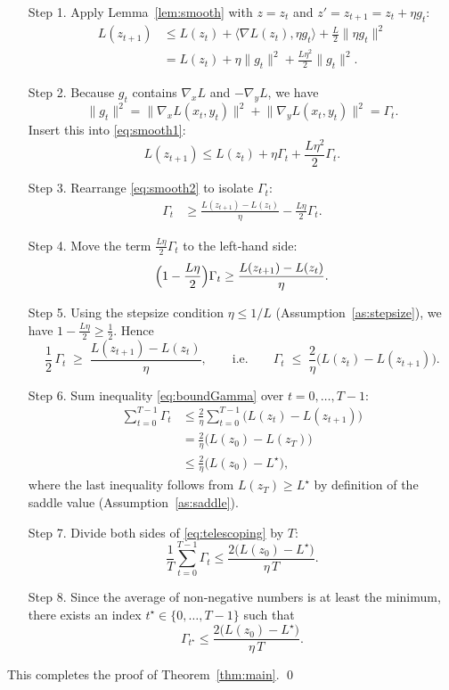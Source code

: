 \documentclass{article}
\newcommand{\grad}{\nabla}
\begin{document}
\begin{enumerate}
\item[Step 1.] Apply Lemma~\ref{lem:smooth} with $z=z_t$ and $z'=z_{t+1}=z_t+\eta g_t$:
\begin{align}
L(z_{t+1}) 
&\le L(z_t)+\langle\grad L(z_t),\eta g_t\rangle+\frac{L}{2}\|\eta g_t\|^{2} \nonumber\\
&= L(z_t)+\eta\|g_t\|^{2}+\frac{L\eta^{2}}{2}\|g_t\|^{2}. \label{eq:smooth1}
\end{align}
\item[Step 2.] Because $g_t$ contains $\grad_x L$ and $-\grad_y L$, we have
\[
\|g_t\|^{2}= \big\|\grad_{x}L(x_t,y_t)\big\|^{2}
+\big\|\grad_{y}L(x_t,y_t)\big\|^{2} = \Gamma_t .
\]
Insert this into \eqref{eq:smooth1}:
\begin{equation}
L(z_{t+1})\le L(z_t)+\eta\Gamma_t+\frac{L\eta^{2}}{2}\Gamma_t . \label{eq:smooth2}
\end{equation}
\item[Step 3.] Rearrange \eqref{eq:smooth2} to isolate $\Gamma_t$:
\begin{align}
\Gamma_t 
&\ge \frac{L(z_{t+1})-L(z_t)}{\eta}
     -\frac{L\eta}{2}\Gamma_t . \label{eq:rearr1}
\end{align}
\item[Step 4.] Move the term $ \frac{L\eta}{2}\Gamma_t $ to the left‑hand side:
\[
\Bigl(1-\frac{L\eta}{2}\Bigr)\Gamma_t 
\ge \frac{L(z_{t+1})-L(z_t)}{\eta}.
\]
\item[Step 5.] Using the stepsize condition $\eta\le 1/L$ (Assumption~\ref{as:stepsize}), we have $1-\frac{L\eta}{2}\ge \frac12$.  Hence
\begin{equation}
\frac12\,\Gamma_t \;\ge\; \frac{L(z_{t+1})-L(z_t)}{\eta},
\qquad\text{i.e.}\qquad
\Gamma_t \;\le\; \frac{2}{\eta}\bigl(L(z_t)-L(z_{t+1})\bigr). \label{eq:boundGamma}
\end{equation}
\item[Step 6.] Sum inequality \eqref{eq:boundGamma} over $t=0,\dots,T-1$:
\begin{align}
\sum_{t=0}^{T-1}\Gamma_t
&\le \frac{2}{\eta}\sum_{t=0}^{T-1}\bigl(L(z_t)-L(z_{t+1})\bigr) \nonumber\\
&= \frac{2}{\eta}\bigl(L(z_0)-L(z_T)\bigr) \nonumber\\
&\le \frac{2}{\eta}\bigl(L(z_0)-L^\star\bigr), \label{eq:telescoping}
\end{align}
where the last inequality follows from $L(z_T)\ge L^\star$ by definition of the saddle value (Assumption~\ref{as:saddle}).
\item[Step 7.] Divide both sides of \eqref{eq:telescoping} by $T$:
\begin{equation}
\frac{1}{T}\sum_{t=0}^{T-1}\Gamma_t
\le \frac{2\big(L(z_0)-L^\star\big)}{\eta\,T}. \label{eq:avgBound}
\end{equation}
\item[Step 8.] Since the average of non‑negative numbers is at least the minimum, there exists an index $t^\star\in\{0,\dots,T-1\}$ such that
\[
\Gamma_{t^\star}\le \frac{2\big(L(z_0)-L^\star\big)}{\eta\,T}.
\]
\end{enumerate}
This completes the proof of Theorem~\ref{thm:main}.  \qed
\end{document}
